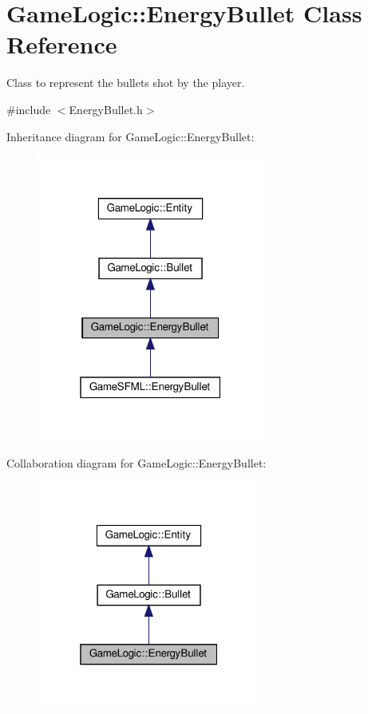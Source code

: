 \hypertarget{classGameLogic_1_1EnergyBullet}{}\section{Game\+Logic\+:\+:Energy\+Bullet Class Reference}
\label{classGameLogic_1_1EnergyBullet}


Class to represent the bullets shot by the player.  




{\ttfamily \#include $<$Energy\+Bullet.\+h$>$}



Inheritance diagram for Game\+Logic\+:\+:Energy\+Bullet\+:
\nopagebreak
\begin{figure}[H]
\begin{center}
\leavevmode
\includegraphics[width=211pt]{classGameLogic_1_1EnergyBullet__inherit__graph}
\end{center}
\end{figure}


Collaboration diagram for Game\+Logic\+:\+:Energy\+Bullet\+:
\nopagebreak
\begin{figure}[H]
\begin{center}
\leavevmode
\includegraphics[width=208pt]{classGameLogic_1_1EnergyBullet__coll__graph}
\end{center}
\end{figure}
